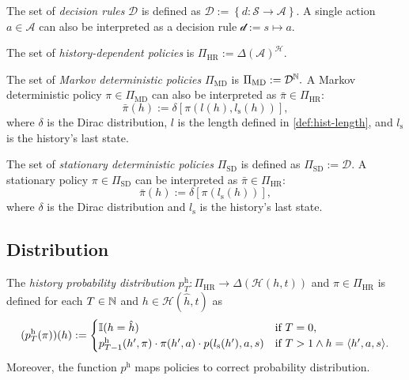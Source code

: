 \begin{definition} \label{def:decision-rule}
The set of \emph{decision rules} $\mathcal{D}$ is defined as \(\mathcal{D} := \left\{ d \colon \mathcal{S} \to \mathcal{A} \right\}. \) A single action $a \in \mathcal{A}$ can also be interpreted as a decision rule $\mathcal{d} := s \mapsto a$.
\leanok
\end{definition}

\begin{definition} \label{def:policy-hr}
The set of \emph{history-dependent policies} is \(\Pi_{\mathrm{HR}} :=  \Delta(\mathcal{A})^{\mathcal{H}}. \)
 \leanok
\end{definition}


\begin{definition} \label{def:policy-md}
The set of \emph{Markov deterministic policies} $\Pi_{\mathrm{MD}}$ is \(\Pi_{\mathrm{MD}} :=  \mathcal{D}^{\mathbb{N}}. \)
A Markov deterministic policy $\pi \in \Pi_{\mathrm{MD}}$ can also be interpreted as $\bar{\pi} \in \Pi_{\mathrm{HR}}$:
\[
  \bar{\pi}(h) := \delta \left[  \pi(l(h), l_{\mathrm{s}}(h)) \right],
\]
where $\delta$ is the Dirac distribution, $l$ is the length defined in \cref{def:hist-length}, and $l_{\mathrm{s}}$ is the history's last state.
\leanok
\end{definition}

\begin{definition} \label{def:policy-sd}
The set of \emph{stationary deterministic policies} $\Pi_{\mathrm{SD}}$ is defined as \(\Pi_{\mathrm{SD}} := \mathcal{D}. \)
A stationary policy $\pi \in \Pi_{\mathrm{SD}}$ can be interpreted as $\bar{\pi} \in \Pi_{\mathrm{HR}}$:
\[
  \bar{\pi}(h) := \delta \left[  \pi(l_{\mathrm{s}}(h)) \right],
\]
where $\delta$ is the Dirac distribution and $l_{\mathrm{s}}$ is the history's last state.
\leanok
\end{definition}

\subsection{Distribution}


\begin{definition}\label{def:hist-dist}
The \emph{history probability distribution} $p^{\mathrm{h}}_T \colon  \Pi_{\mathrm{HR}} \to \Delta(\mathcal{H}(h,t))$  and $\pi \in \Pi_{\mathrm{HR}}$ is defined for each $T \in \mathbb{N}$ and $h\in \mathcal{H}(\hat{h},t)$ as
\[
(p^{\mathrm{h}}_T(\pi))(h) :=
\begin{cases}
\mathbb{I}(h = \hat{h}) &\text{if } T = 0, \\
p_{T-1}^{\mathrm{h}}(h', \pi) \cdot \pi(h',a) \cdot  p(l_{\mathrm{s}}(h'), a , s) &\text{if } T > 1 \wedge h = \langle h', a, s \rangle.
\end{cases}
\]
Moreover, the function $p^{\mathrm{h}}$ maps policies to correct probability distribution.
 \leanok
\end{definition}

